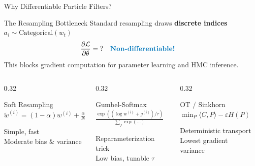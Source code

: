 \documentclass[aspectratio=169,10pt]{beamer}
\newcommand{\highlight}[1]{\textcolor{jpmlightblue}{\textbf{#1}}}
\begin{document}
\begin{frame}{Why Differentiable Particle Filters?}

\begin{alertblock}{The Resampling Bottleneck}
Standard resampling draws \textbf{discrete indices} $a_i \sim \text{Categorical}(w_t)$
\[
  \frac{\partial \mathcal{L}}{\partial \theta} = \;?\quad \text{\highlight{Non-differentiable!}}
\]
This blocks gradient computation for parameter learning and HMC inference.
\end{alertblock}

\vspace{0.5em}
\begin{columns}[T]
\begin{column}{0.32\textwidth}
\begin{exampleblock}{\centering Soft Resampling}
\centering
$\tilde{w}^{(i)} = (1\!-\!\alpha)w^{(i)} + \frac{\alpha}{N}$
\vspace{0.3em}

{\scriptsize Simple, fast\\Moderate bias \& variance}
\end{exampleblock}
\end{column}
\begin{column}{0.32\textwidth}
\begin{exampleblock}{\centering Gumbel-Softmax}
\centering
$\frac{\exp((\log w^{(i)} + g^{(i)})/\tau)}{\sum_j \exp(\cdots)}$
\vspace{0.3em}

{\scriptsize Reparameterization trick\\Low bias, tunable $\tau$}
\end{exampleblock}
\end{column}
\begin{column}{0.32\textwidth}
\begin{exampleblock}{\centering OT / Sinkhorn}
\centering
$\min_{P} \langle C, P \rangle - \varepsilon H(P)$
\vspace{0.3em}

{\scriptsize Deterministic transport\\Lowest gradient variance}
\end{exampleblock}
\end{column}
\end{columns}
\end{frame}
\end{document}
